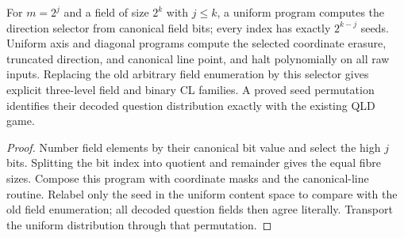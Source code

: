 \begin{lemma}
\label{lem:intro-executable-seeded-lines}
\leanok
For $m=2^j$ and a field of size $2^k$ with $j\leq k$, a uniform program
computes the direction selector from canonical field bits; every index
has exactly $2^{k-j}$ seeds. Uniform axis and diagonal programs compute
the selected coordinate erasure, truncated direction, and canonical
line point, and halt polynomially on all raw inputs. Replacing the old
arbitrary field enumeration by this selector gives explicit three-level
field and binary CL families. A proved seed permutation identifies their
decoded question distribution exactly with the existing QLD game.
\end{lemma}
\begin{proof}
\leanok
Number field elements by their canonical bit value and select the high
$j$ bits. Splitting the bit index into quotient and remainder gives the
equal fibre sizes. Compose this program with coordinate masks and the
canonical-line routine. Relabel only the seed in the uniform content
space to compare with the old field enumeration; all decoded question
fields then agree literally. Transport the uniform distribution through
that permutation.
\end{proof}

